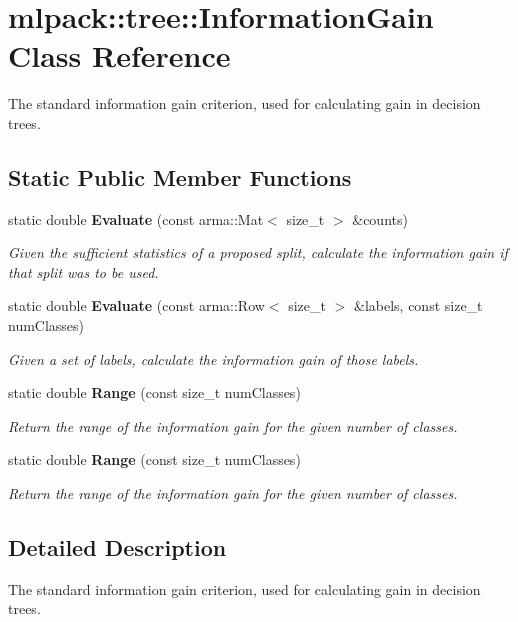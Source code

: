 \section{mlpack\+:\+:tree\+:\+:Information\+Gain Class Reference}
\label{classmlpack_1_1tree_1_1InformationGain}


The standard information gain criterion, used for calculating gain in decision trees.  


\subsection*{Static Public Member Functions}
\begin{DoxyCompactItemize}
\item 
static double {\bf Evaluate} (const arma\+::\+Mat$<$ size\+\_\+t $>$ \&counts)
\begin{DoxyCompactList}\small\item\em Given the sufficient statistics of a proposed split, calculate the information gain if that split was to be used. \end{DoxyCompactList}\item 
static double {\bf Evaluate} (const arma\+::\+Row$<$ size\+\_\+t $>$ \&labels, const size\+\_\+t num\+Classes)
\begin{DoxyCompactList}\small\item\em Given a set of labels, calculate the information gain of those labels. \end{DoxyCompactList}\item 
static double {\bf Range} (const size\+\_\+t num\+Classes)
\begin{DoxyCompactList}\small\item\em Return the range of the information gain for the given number of classes. \end{DoxyCompactList}\item 
static double {\bf Range} (const size\+\_\+t num\+Classes)
\begin{DoxyCompactList}\small\item\em Return the range of the information gain for the given number of classes. \end{DoxyCompactList}\end{DoxyCompactItemize}


\subsection{Detailed Description}
The standard information gain criterion, used for calculating gain in decision trees. 

